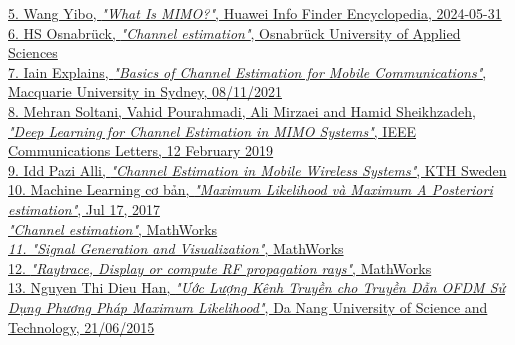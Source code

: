 \documentclass{article}
\begin{document}
\href{ https://info.support.huawei.com/info-finder/encyclopedia/en/MIMO.html }{5. Wang Yibo, \textit{"What Is MIMO?"}, Huawei Info Finder Encyclopedia, 2024-05-31} \\

\href{ https://www.hs-osnabrueck.de/fileadmin/HSOS/Forschung/Recherche/Laboreinrichtungen_und_Versuchsbetriebe/Labor_fuer_Hochfrequenztechnik_und_Mobilkommunikation/Forschung/digitale_Funksysteme/Channel-Estimation.pdf }{6. HS Osnabrück, \textit{"Channel estimation"}, Osnabrück University of Applied Sciences} \\

\href{ https://www.youtube.com/watch?v=ZsLh01nlRzY&t=3s }{7. Iain Explains, \textit{"Basics of Channel Estimation for Mobile Communications"}, Macquarie University in Sydney, 08/11/2021} \\

\href{ https://ieeexplore.ieee.org/document/8640815 }{8. Mehran Soltani, Vahid Pourahmadi, Ali Mirzaei and Hamid Sheikhzadeh, \textit{"Deep Learning for Channel Estimation in MIMO Systems"}, IEEE Communications Letters, 12 February 2019} \\

\href{ https://kth.diva-portal.org/smash/get/diva2:538857/FULLTEXT01.pdf }{9. Idd Pazi Alli, \textit{"Channel Estimation in Mobile Wireless Systems"}, KTH Sweden} \\

\href{ https://machinelearningcoban.com/2017/07/17/mlemap/ }{10.  Machine Learning cơ bản, \textit{"Maximum Likelihood và Maximum A Posteriori estimation"}, Jul 17, 2017} \\

\href{ https://www.mathworks.com/help/lte/ug/channel-estimation.html }{\textit{"Channel estimation"}, MathWorks} \\

\href{ https://www.mathworks.com/help/signal/ug/signal-generation-and-visualization.html }{\textit{11. "Signal Generation and Visualization"}, MathWorks} \\

\href{ https://www.mathworks.com/help/comm/ref/txsite.raytrace.html }{12. \textit{"Raytrace, Display or compute RF propagation rays"}, MathWorks} \\

\href{ http://tailieuso.udn.vn/bitstream/TTHL_125/8428/2/NguyenThiDieuHan.TT.pdf }{13. Nguyen Thi Dieu Han, \textit{"Ước Lượng Kênh Truyền cho Truyền Dẫn OFDM Sử Dụng Phương Pháp Maximum Likelihood"}, Da Nang University of Science and Technology, 21/06/2015} \\
\end{document}
